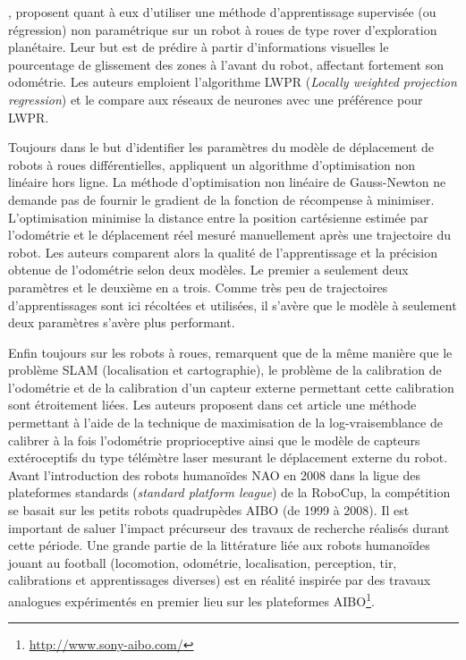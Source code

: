 \cite{angelova_learning_2007}, proposent quant à eux d'utiliser une méthode
d'apprentissage supervisée (ou régression) non paramétrique sur un robot 
à roues de type rover d'exploration planétaire.
Leur but est de prédire à partir d'informations visuelles le pourcentage 
de glissement des zones à l'avant du robot, affectant fortement son odométrie.
Les auteurs emploient l'algorithme LWPR (\textit{Locally weighted projection regression}) 
et le compare aux réseaux de neurones avec une préférence pour LWPR.

Toujours dans le but d'identifier les paramètres du modèle de déplacement
de robots à roues différentielles, \cite{ivanjko_simple_2007} appliquent un algorithme
d'optimisation non linéaire hors ligne.
La méthode d'optimisation non linéaire de Gauss-Newton
ne demande pas de fournir le gradient de la fonction de récompense à minimiser.
L'optimisation minimise la distance entre la position cartésienne estimée par l'odométrie
et le déplacement réel mesuré manuellement après une trajectoire du robot.
Les auteurs comparent alors la qualité de l'apprentissage et la précision 
obtenue de l'odométrie selon deux modèles. Le premier a seulement deux paramètres
et le deuxième en a trois.
Comme très peu de trajectoires d'apprentissages sont ici récoltées et utilisées, 
il s'avère que le modèle à seulement deux paramètres s'avère plus performant.

Enfin toujours sur les robots à roues, \cite{censi_simultaneous_2013} remarquent
que de la même manière que le problème SLAM (localisation et cartographie), 
le problème de la calibration de l'odométrie et de la calibration d'un capteur externe permettant 
cette calibration sont étroitement liées.
Les auteurs proposent dans cet article une méthode permettant à l'aide de la technique
de maximisation de la log-vraisemblance de calibrer à la fois l'odométrie proprioceptive 
ainsi que le modèle de capteurs extéroceptifs du type télémètre laser mesurant le déplacement 
externe du robot.\\

Avant l'introduction des robots humanoïdes NAO en 2008 dans 
la ligue des plateformes standards (\textit{standard platform league}) 
de la RoboCup, la compétition se basait sur les petits robots quadrupèdes AIBO
(de 1999 à 2008).
Il est important de saluer l'impact précurseur des travaux de recherche
réalisés durant cette période.
Une grande partie de la littérature liée
aux robots humanoïdes jouant au football (locomotion, odométrie, 
localisation, perception, tir, calibrations et apprentissages diverses) 
est en réalité inspirée par des travaux analogues expérimentés 
en premier lieu sur les plateformes AIBO\footnote{\url{http://www.sony-aibo.com/}}.

